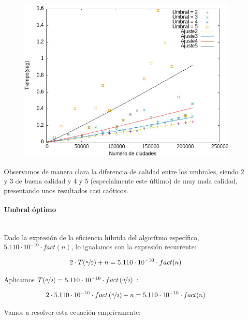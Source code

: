 \documentclass{article}
\newcommand{\myparagraph}[1]{\paragraph{#1}\mbox{}\\}
\begin{document}
\begin{figure}[H]
    \centering
    \includegraphics[scale=0.7]{P3/Umbral/dani_comparacion_umbrales.jpeg}
\end{figure}

Observamos de manera clara la diferencia de calidad entre los umbrales, siendo 2 y 3 de buena calidad y 4 y 5 (especialmente este último) de muy mala calidad, presentando unos resultados casi caóticos.
\newpage


\myparagraph{Umbral óptimo}

    Dado la expresión de la eficiencia híbrida del algorítmo específico, $5.110\cdot10^{-10} \cdot fact(n)$, lo igualamos con la expresión recurrente: 

    \[
        2\cdot T(\nicefrac{n}{2}) + n = 5.110\cdot10^{-10} \cdot fact(n)
    \]

    Aplicamos $T(\nicefrac{n}{2}) = 5.110\cdot10^{-10} \cdot fact\left(\nicefrac{n}{2}\right)$ :
    
    \begin{align*}
        &2\cdot 5.110\cdot10^{-10} \cdot fact\left(\nicefrac{n}{2}\right) + n = 5.110\cdot10^{-10} \cdot fact(n) \\
    \end{align*}

    Vamos a resolver esta ecuación emprícamente:
\end{document}
